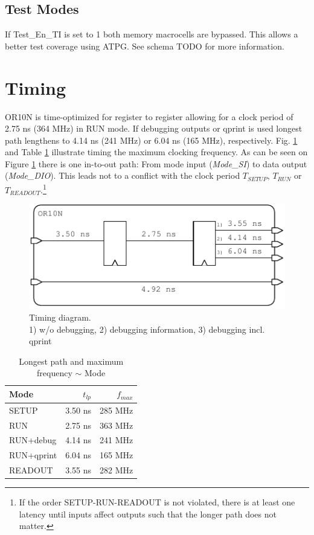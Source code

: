 \subsection{Test Modes}
If Test\_En\_TI is set to 1 both memory macrocells are bypassed. This allows a better test coverage using ATPG. See schema TODO for more information.

\section{Timing}
OR10N is time-optimized for register to register allowing for a clock period of 2.75 ns (364 MHz) in RUN mode. If debugging outputs or qprint is used longest path lengthens to 4.14 ns (241 MHz) or 6.04 ns (165 MHz), respectively. Fig. \ref{fig:timing} and Table \ref{tab:timing} illustrate timing the maximum clocking frequency. As can be seen on Figure \ref{fig:timing} there is one in-to-out path: From mode input (\textit{Mode\_SI}) to data output (\textit{Mode\_DIO}). This leads not to a conflict with the clock period $T_{SETUP}$, $T_{RUN}$ or $T_{READOUT}$.\footnote{If the order SETUP-RUN-READOUT is not violated, there is at least one latency until inputs affect outputs such that the longer path does not matter.}

\begin{figure}[htbp]
  \centering
  \includegraphics[width=0.7\linewidth]{./figures/delays}
  \caption[Timing diagram]{Timing diagram.\\1) w/o debugging, 2) debugging information, 3) debugging incl. qprint}
  \label{fig:timing}
\end{figure}
\begin{table}[htbp]
 \caption{Longest path and maximum frequency $\sim$ Mode}
 \label{tab:timing}
\centering\begin{tabular}{|l|r|r|} \hline
Mode & $t_{lp}$ & $f_{max}$ \\ \hline
SETUP & 3.50 ns & 285 MHz \\ \hline
RUN & 2.75 ns & 363 MHz \\ \hline
RUN+debug & 4.14 ns & 241 MHz \\ \hline
RUN+qprint & 6.04 ns & 165 MHz \\ \hline
READOUT & 3.55 ns & 282 MHz \\ \hline

 \end{tabular}
\end{table}


